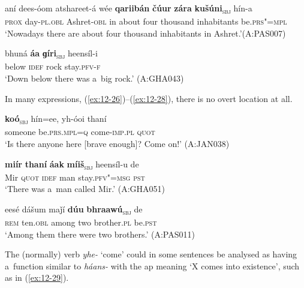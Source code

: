 \begin{exe}
\ex
\label{ex:12-24}
\gll aní dees-óom atshareet-á wée {\ob}\textbf{qariibán} \textbf{čúur} \textbf{zára} \textbf{kušúni}{\cb}\textsubscript{\textsc{\upshape sbj}} hín-a \\
\textsc{prox} day-\textsc{pl.obl} Ashret-\textsc{obl} in about  four thousand inhabitants be.\textsc{prs"=mpl}\\
\glt `Nowadays there are about four thousand inhabitants in Ashret.'\newline (A:PAS007)

\ex
\label{ex:12-25}
\gll bhuná {\ob}\textbf{áa} \textbf{ɡíri}{\cb}\textsubscript{\textsc{\upshape sbj}} heensíl-i\\
below \textsc{idef} rock stay.\textsc{pfv-f} \\
\glt `Down below there was a~big rock.' (A:GHA043)
\end{exe}

In many  expressions, (\ref{ex:12-26})--(\ref{ex:12-28}), there is no overt location at all.

\begin{exe}
\ex
\label{ex:12-26}
\gll {\ob}\textbf{koó}{\cb}\textsubscript{\textsc{\upshape sbj}} hín=ee, yh-óoi thaní \\
someone be.\textsc{prs.mpl}=\textsc{q} come-\textsc{imp.pl} \textsc{quot} \\
\glt `Is there anyone here [brave enough]? Come on!' (A:JAN038)
\end{exe}
\begin{exe}
\ex
\label{ex:12-27}
\gll {\ob}\textbf{miír} \textbf{thaní} \textbf{áak} \textbf{míiš}{\cb}\textsubscript{\textsc{\upshape sbj}} heensíl-u de \\
Mir \textsc{quot} \textsc{idef} man stay.\textsc{pfv"=msg} \textsc{pst} \\
\glt `There was a~man called Mir.' (A:GHA051)
\end{exe}
\begin{exe}
\ex
\label{ex:12-28}
\gll eesé dášum maǰí {\ob}\textbf{dúu} \textbf{bhraawú}{\cb}\textsubscript{\textsc{\upshape sbj}} de\\
\textsc{rem} ten.\textsc{obl} among two brother.\textsc{pl} be.\textsc{pst}\\
\glt `Among them there were two brothers.' (A:PAS011)
\end{exe}

The (normally)  verb \textit{yhe-} `come' could in some sentences be analysed as having a~function similar to \textit{háans-} with the ap meaning `X comes into existence', such as in (\ref{ex:12-29}).

